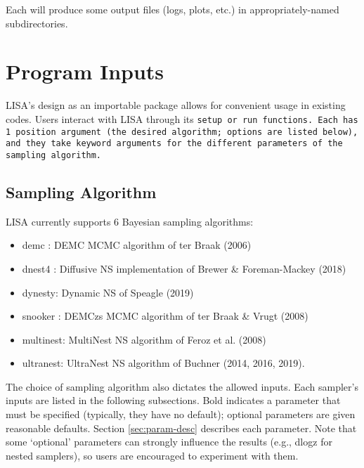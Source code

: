 \documentclass[letterpaper, 12pt]{article}
\begin{document}
\noindent Each will produce some output files (logs, plots, etc.) in 
appropriately-named subdirectories.\newline


\section{Program Inputs}
\label{sec:inputs}

LISA's design as an importable package allows for convenient usage in existing 
codes.  Users interact with LISA through its \tt{setup} or \tt{run} functions. 
Each has 1 position argument (the desired algorithm; options are listed below), 
and they take keyword arguments for the different parameters of the sampling 
algorithm.  

\subsection{Sampling Algorithm}

LISA currently supports 6 Bayesian sampling algorithms:
\begin{itemize}
\item demc   : DEMC MCMC algorithm of ter Braak (2006)
\item dnest4 : Diffusive NS implementation of Brewer \& Foreman-Mackey (2018)
\item dynesty: Dynamic NS of Speagle (2019)
\item snooker  : DEMCzs MCMC algorithm of ter Braak \& Vrugt (2008)
\item multinest: MultiNest NS algorithm of Feroz et al. (2008)
\item ultranest: UltraNest NS algorithm of Buchner (2014, 2016, 2019).
\end{itemize}

\noindent The choice of sampling algorithm also dictates the allowed inputs.  
Each sampler's inputs are listed in the following subsections.  Bold 
indicates a parameter that must be specified (typically, they have no default); 
optional parameters are given reasonable defaults.  Section 
\ref{sec:param-desc} describes each parameter.  Note that some `optional' 
parameters can strongly influence the results (e.g., dlogz for nested samplers),
so users are encouraged to experiment with them.
\end{document}
